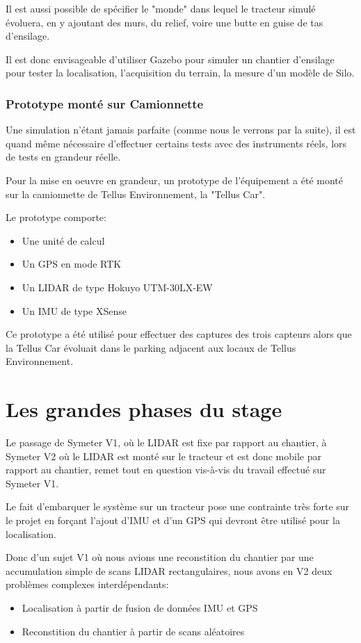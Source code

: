 \documentclass[12pt,a4paper]{report}
\begin{document}
			\para Il est aussi possible de spécifier le "monde" dans lequel le tracteur simulé évoluera, en y ajoutant des murs, du relief, voire une butte en guise de tas d'ensilage.

			
			\para Il est donc envisageable d'utiliser Gazebo pour simuler un chantier d'ensilage pour tester la localisation, l'acquisition du terrain, la mesure d'un modèle de Silo.
			
			\subsubsection{Prototype monté sur Camionnette}
			
			Une simulation n'étant jamais parfaite (comme nous le verrons par la suite), il est quand même nécessaire d'effectuer certains tests avec des instruments réels, lors de tests en grandeur réelle.
		
			\para Pour la mise en oeuvre en grandeur, un prototype de l'équipement a été monté sur la camionnette de Tellus Environnement, la "Tellus Car".
			
			\para Le prototype comporte:
			\begin{itemize}
				\item Une unité de calcul
				\item Un GPS en mode RTK
				\item Un LIDAR de type Hokuyo UTM-30LX-EW
				\item Un IMU de type XSense
			\end{itemize}
		
			\para Ce prototype a été utilisé pour effectuer des captures des trois capteurs alors que la Tellus Car évoluait dans le parking adjacent aux locaux de Tellus Environnement.
		
	\section{Les grandes phases du stage}
	
	Le passage de Symeter V1, où le LIDAR est fixe par rapport au chantier, à Symeter V2 où le LIDAR est monté sur le tracteur et est donc mobile par rapport au chantier, remet tout en question vis-à-vis du travail effectué sur Symeter V1.
	
	\para Le fait d'embarquer le système sur un tracteur pose une contrainte très forte sur le projet en forçant l'ajout d'IMU et d'un GPS qui devront être utilisé pour la localisation.
	
	\para Donc d'un sujet V1 où nous avions une reconstition du chantier par une accumulation simple de scans LIDAR rectangulaires, nous avons en V2 deux  problèmes complexes interdépendants:
	\begin{itemize}
		\item Localisation à partir de fusion de données IMU et GPS
		\item Reconstition du chantier à partir de scans aléatoires
	\end{itemize}
\end{document}
